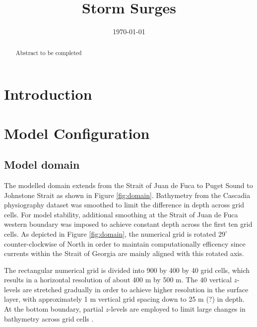 \documentclass[pdftex,12pt]{article}
\title{Storm Surges}
\date{\today}
\begin{document}
\maketitle

\begin{abstract}
Abstract to be completed
\end{abstract}

\section{Introduction}\label{sec:intro}
\citep{masson2004modelling} %

\section{Model Configuration}\label{sec:config}
\subsection{Model domain}
The modelled domain extends from the Strait of Juan de Fuca to Puget Sound to Johnstone Strait as shown in Figure \ref{fig:domain}. Bathymetry from the Cascadia physiography dataset \citep{haugerud1999digital} was smoothed to limit the difference in depth across grid cells. For model stability, additional smoothing at the Strait of Juan de Fuca western boundary was imposed to achieve constant depth across the first ten grid cells. As depicted in Figure \ref{fig:domain}, the numerical grid is rotated $29^{\circ}$ counter-clockwise of North in order to maintain computationally efficency since currents within the Strait of Georgia are mainly aligned with this rotated axis. 

The rectangular numerical grid is divided into 900 by 400 by 40 grid cells, which results in a horizontal resolution of about 400 m by 500 m. The 40 vertical $z$-levels are stretched gradually in order to achieve higher resolution in the surface layer, with approximately 1 m vertical grid spacing down to 25 m (?) in depth. At the bottom boundary, partial $z$-levels are employed to limit large changes in bathymetry across grid cells \citep{madec2008nemo}. 
\end{document}
